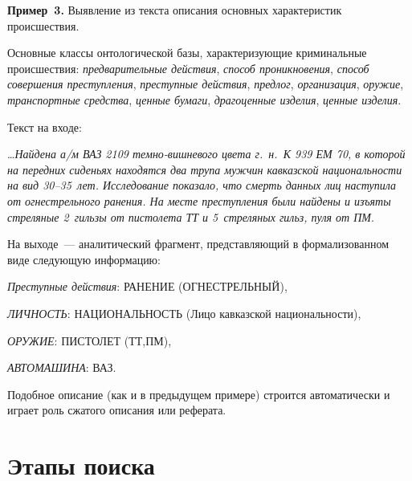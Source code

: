 \begin{multicols}{2}
    \medskip
    
    \noindent
    \textbf{Пример~3.} Выявление из текста описания основных 
характеристик происшествия.
    
    Основные классы онтологической базы, характеризующие криминальные 
происшествия: \textit{предварительные действия}, \textit{способ 
проникновения}, \textit{способ совершения преступления}, \textit{преступные 
действия}, \textit{предлог}, \textit{организация}, \textit{оружие}, 
\textit{транспортные средства}, \textit{ценные бумаги}, \textit{драгоценные 
изделия}, \textit{ценные изделия}.
    
    Текст на входе:
    
    \ldots\textit{Найдена а/м ВАЗ 2109 темно-вишневого цвета г.~н.\ К 939 ЕМ 
70, в которой на передних сиденьях находятся два трупа мужчин кавказской 
национальности на вид 30--35~лет. Исследование показало, что смерть 
данных лиц наступила от огнестрельного ранения. На месте преступления 
были найдены и изъяты стреляные 2~гильзы от пистолета ТТ и 5~стреляных 
гильз, пуля от ПМ}.
    
    На выходе~--- аналитический фрагмент, представляющий в 
формализованном виде следующую информацию:

     \smallskip
     
{\small 
\noindent
     \textit{Преступные действия}: РАНЕНИЕ (ОГНЕСТРЕЛЬНЫЙ),
     
\noindent
     \textit{ЛИЧНОСТЬ}: НАЦИОНАЛЬНОСТЬ (Лицо кавказской национальности),
     
\noindent
\textit{ОРУЖИЕ}: ПИСТОЛЕТ (ТТ,ПМ),
     
\noindent
     \textit{АВТОМАШИНА}: ВАЗ.
     
     }
     
     \smallskip
     
    Подобное описание (как и в предыдущем примере) строится 
автоматически и играет роль сжатого описания или реферата.
    
\section{Этапы поиска}
    

\end{multicols}
